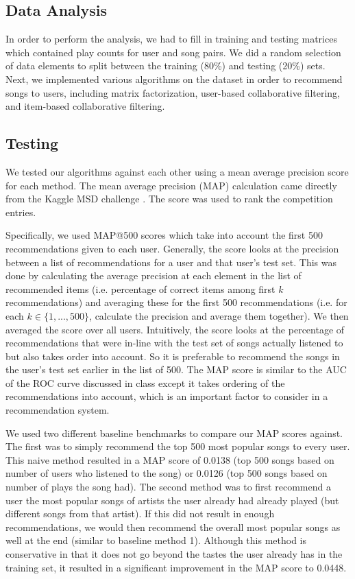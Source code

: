 \documentclass[11pt,preprint]{aastex}
\begin{document}
\subsection{Data Analysis}
In order to perform the analysis, we had to fill in training and testing matrices which contained play counts for user and song pairs. We did a random selection of data elements to split between the training (80\%) and testing (20\%) sets. Next, we implemented various algorithms on the dataset in order to recommend songs to users, including matrix factorization, user-based collaborative filtering, and item-based collaborative filtering.

\subsection{Testing}
We tested our algorithms against each other using a mean average precision 
score for each method.  The mean average precision (MAP) calculation came directly from the Kaggle MSD challenge \citep{McFee:2012:MSD:2187980.2188222}. The score was used to rank the competition entries.

Specifically, we used MAP@500 scores which take into account the first 500 recommendations given to each user. Generally, the score looks at the precision between a list of recommendations for a user and that user's test set. This was done by calculating the average precision at each element in the list of recommended items (i.e. percentage of correct items among first $k$ recommendations) and averaging these for the first 500 recommendations (i.e. for each $k \in \{1, ..., 500\}$, calculate the precision and average them together).
We then averaged the score over all users. Intuitively, the score looks at the percentage of recommendations that were in-line with the test set of songs actually listened to but also takes order into account. So it is preferable to recommend the songs in the user's test set earlier in the list of 500. The MAP score is similar to the AUC of the ROC curve discussed in class except it takes ordering of the recommendations into account, which is an important factor to consider in a recommendation system.

We used two different baseline benchmarks \citep{McFee:2012:MSD:2187980.2188222} to compare our MAP scores against. The first was to simply recommend the top 500 most popular songs to every user. This naive method resulted in a MAP score of 0.0138 (top 500 songs based on number of users who listened to the song) or 0.0126 (top 500 songs based on number of plays the song had). The second method was to first recommend a user the most popular songs of artists the user already had already played (but different songs from that artist). If this did not result in enough recommendations, we would then recommend the overall most popular songs as well at the end (similar to baseline method 1). Although this method is conservative in that it does not go beyond the tastes the user already has in the training set, it resulted in a significant improvement in the MAP score to 0.0448.
\end{document}
